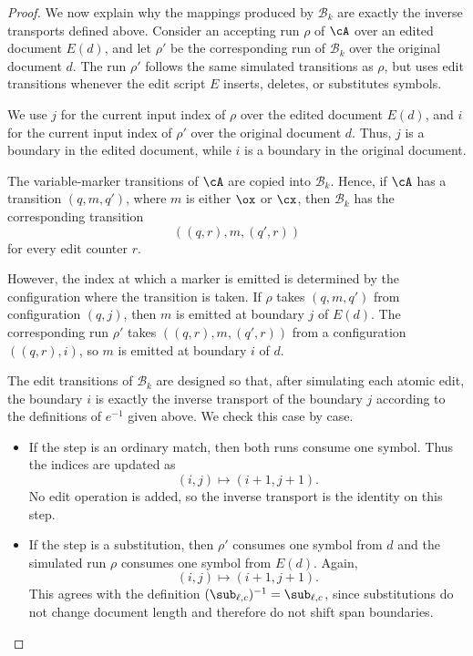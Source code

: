 \begin{proof}
	
	We now explain why the mappings produced by $\mathcal{B}_k$ are exactly the inverse transports defined above. Consider an accepting run $\rho$ of $\cA$ over an edited document $E(d)$, and let $\rho'$ be the corresponding run of $\mathcal{B}_k$ over the original document $d$. The run $\rho'$ follows the same simulated transitions as $\rho$, but uses edit transitions whenever the edit script $E$ inserts, deletes, or substitutes symbols.
	
	We use $j$ for the current input index of $\rho$ over the edited document $E(d)$, and $i$ for the current input index of $\rho'$ over the original document $d$. Thus, $j$ is a boundary in the edited document, while $i$ is a boundary in the original document.
	
	The variable-marker transitions of $\cA$ are copied into $\mathcal{B}_k$. Hence, if $\cA$ has a transition $(q,m,q')$, where $m$ is either $\ox$ or $\cx$, then $\mathcal{B}_k$ has the corresponding transition
	\[
	((q,r),m,(q',r))
	\]
	for every edit counter $r$.
	
	However, the index at which a marker is emitted is determined by the configuration where the transition is taken. If $\rho$ takes $(q,m,q')$ from configuration $(q,j)$, then $m$ is emitted at boundary $j$ of $E(d)$. The corresponding run $\rho'$ takes $((q,r),m,(q',r))$ from a configuration $((q,r),i)$, so $m$ is emitted at boundary $i$ of $d$.
	
	The edit transitions of $\mathcal{B}_k$ are designed so that, after simulating each atomic edit, the boundary $i$ is exactly the inverse transport of the boundary $j$ according to the definitions of $e^{-1}$ given above. We check this case by case.
	
	\begin{itemize}
		\item If the step is an ordinary match, then both runs consume one symbol. Thus the indices are updated as
		\[
		(i,j)\mapsto(i+1,j+1).
		\]
		No edit operation is added, so the inverse transport is the identity on this step.
		
		\item If the step is a substitution, then $\rho'$ consumes one symbol from $d$ and the simulated run $\rho$ consumes one symbol from $E(d)$. Again,
		\[
		(i,j)\mapsto(i+1,j+1).
		\]
		This agrees with the definition $(\sub_{\ell,c})^{-1}=\sub_{\ell,c}$, since substitutions do not change document length and therefore do not shift span boundaries.
		

\end{itemize}
\end{proof}
